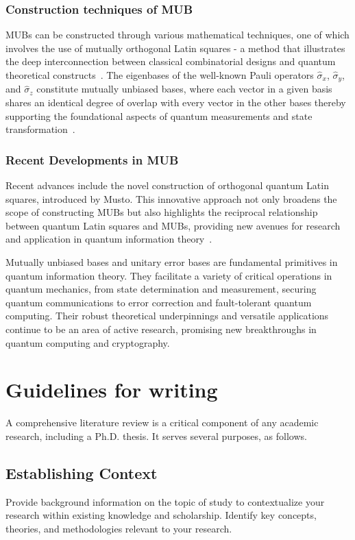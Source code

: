 \subsubsection{Construction techniques of MUB}
MUBs can be constructed through various mathematical techniques, one of which involves the use of mutually orthogonal Latin squares - a method that illustrates the deep interconnection between classical combinatorial designs and quantum theoretical constructs~\cite{wocjan2005NewConstructionMutually, rao2010MutuallyOrthogonalLatin}.
The eigenbases of the well-known Pauli operators $\hat{\sigma}_x$, $\hat{\sigma}_y$, and $\hat{\sigma}_z$ constitute mutually unbiased bases, where each vector in a given basis shares an identical degree of overlap with every vector in the other bases thereby supporting the foundational aspects of quantum measurements and state transformation~\cite{paterek2009MutuallyUnbiasedBases}.

\subsubsection{Recent Developments in MUB}
Recent advances include the novel construction of orthogonal quantum Latin squares, introduced by Musto. This innovative approach not only broadens the scope of constructing MUBs but also highlights the reciprocal relationship between quantum Latin squares and MUBs, providing new avenues for research and application in quantum information theory~\cite{musto2017ConstructingMutuallyUnbiased}.

Mutually unbiased bases and unitary error bases are fundamental primitives in quantum information theory. They facilitate a variety of critical operations in quantum mechanics, from state determination  and measurement, securing quantum communications to error correction and fault-tolerant quantum computing. Their robust theoretical underpinnings and versatile applications continue to be an area of active research, promising new breakthroughs in quantum computing and cryptography.


\section{Guidelines for writing}
A comprehensive literature review is a critical component of any academic research, including a Ph.D. thesis.
It serves several purposes, as follows.

\subsection{Establishing Context}
Provide background information on the topic of study to contextualize your research within existing knowledge and scholarship.
Identify key concepts, theories, and methodologies relevant to your research.

